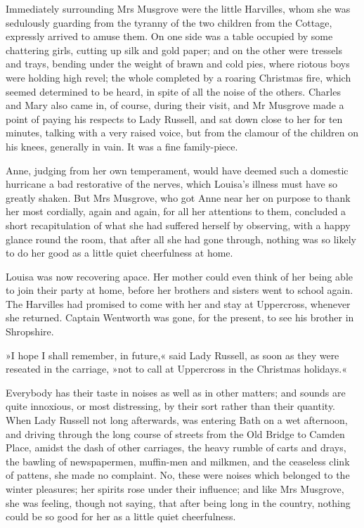 Immediately surrounding Mrs Musgrove were the little Harvilles, whom she was sedulously guarding from the tyranny of the two children from the Cottage, expressly arrived to amuse them. On one side was a table occupied by some chattering girls, cutting up silk and gold paper; and on the other were tressels and trays, bending under the weight of brawn and cold pies, where riotous boys were holding high revel; the whole completed by a roaring Christmas fire, which seemed determined to be heard, in spite of all the noise of the others. Charles and Mary also came in, of course, during their visit, and Mr Musgrove made a point of paying his respects to Lady Russell, and sat down close to her for ten minutes, talking with a very raised voice, but from the clamour of the children on his knees, generally in vain. It was a fine family-piece.

Anne, judging from her own temperament, would have deemed such a domestic hurricane a bad restorative of the nerves, which Louisa's illness must have so greatly shaken. But Mrs Musgrove, who got Anne near her on purpose to thank her most cordially, again and again, for all her attentions to them, concluded a short recapitulation of what she had suffered herself by observing, with a happy glance round the room, that after all she had gone through, nothing was so likely to do her good as a little quiet cheerfulness at home.

Louisa was now recovering apace. Her mother could even think of her being able to join their party at home, before her brothers and sisters went to school again. The Harvilles had promised to come with her and stay at Uppercross, whenever she returned. Captain Wentworth was gone, for the present, to see his brother in Shropshire.

»I hope I shall remember, in future,« said Lady Russell, as soon as they were reseated in the carriage, »not to call at Uppercross in the Christmas holidays.«

Everybody has their taste in noises as well as in other matters; and sounds are quite innoxious, or most distressing, by their sort rather than their quantity. When Lady Russell not long afterwards, was entering Bath on a wet afternoon, and driving through the long course of streets from the Old Bridge to Camden Place, amidst the dash of other carriages, the heavy rumble of carts and drays, the bawling of newspapermen, muffin-men and milkmen, and the ceaseless clink of pattens, she made no complaint. No, these were noises which belonged to the winter pleasures; her spirits rose under their influence; and like Mrs Musgrove, she was feeling, though not saying, that after being long in the country, nothing could be so good for her as a little quiet cheerfulness.

